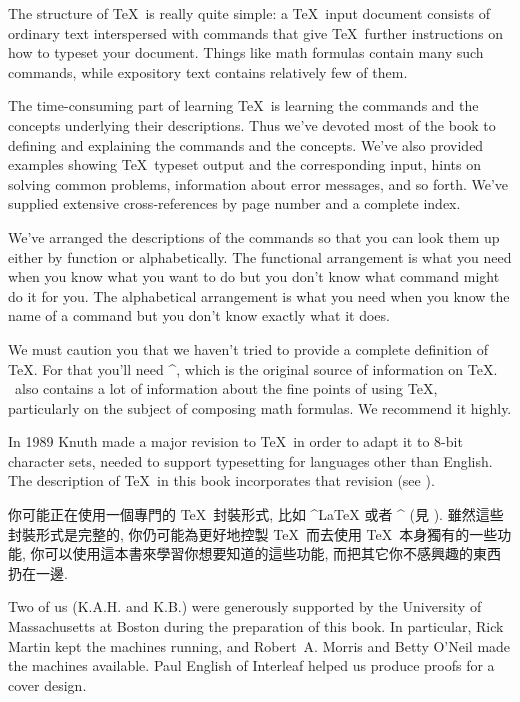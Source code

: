 The structure of \TeX\ is really quite simple: a \TeX\ input document
consists of ordinary text interspersed with commands that give \TeX\
further instructions on how to typeset your document.  Things like math
formulas contain many such commands, while expository text contains
relatively few of them.

The time-consuming part of learning \TeX\ is learning the commands and
the concepts underlying their descriptions.  Thus we've devoted most of
the book to defining and explaining the commands and the concepts.
We've also provided examples showing \TeX\ typeset output and the
corresponding input, hints on solving common problems, information about
error messages, and so forth.  We've supplied extensive cross-references
by page number and a complete index.

We've arranged the descriptions of the commands so that you can look
them up either by function or alphabetically.  The functional
arrangement is what you need when you know what you want to do but you
don't know what command might do it for you.  The alphabetical arrangement
is what you need when you know the name of a command but you don't know exactly
what it does.

We must caution you that we haven't tried to provide a complete
definition of \TeX.  For that you'll need ^{\texbook}, which is the
original source of information on \TeX.  \texbook\ also contains a lot
of information about the fine points of using \TeX, particularly on the
subject of composing math formulas.  We recommend it highly.

In 1989 Knuth made a major revision to \TeX\ in order to adapt it to
$8$-bit character sets, needed to support typesetting for languages
other than English.  The description of \TeX\ in this book incorporates
that revision (see \xref{newtex}).

{\tighten 你可能正在使用一個專門的 \TeX\ 封裝形式, 
比如 ^{\LaTeX} 或者 ^{\AMSTeX} (見 ).
雖然這些封裝形式是完整的, 你仍可能為更好地控製 \TeX\ 而去使用 \TeX\ 本身獨有的一些功能, 
你可以使用這本書來學習你想要知道的這些功能, 
而把其它你不感興趣的東西扔在一邊.\par}

Two of us (K.A.H. and K.B.) were generously supported by the
University of Massachusetts at Boston during the preparation of this
book.  In particular, Rick Martin kept the machines running, and
Robert~A. Morris and Betty O'Neil made the machines available.  Paul
English of Interleaf helped us produce proofs for a cover design.

